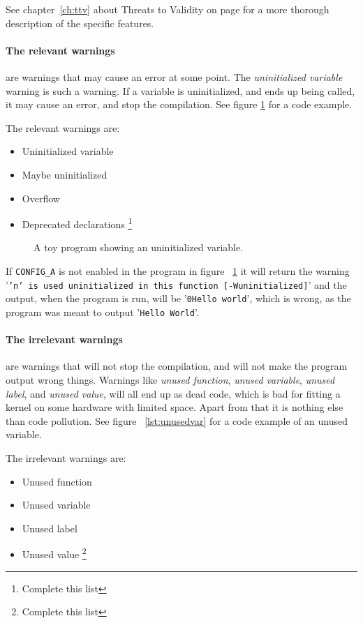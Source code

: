 \documentclass[a4paper,11pt]{report}
\newcommand{\textcode}[1]{
    \fboxsep=1pt
    \texttt{\colorbox{gray!20}{#1}}
}
\newcommand{\figa}{
    \begin{figure}[!htpb]
    \centering
}
\newcommand{\figb}[2]{
    \caption{#1}
    \label{#2}
    \end{figure}
}
\begin{document}
See chapter~\ref{ch:ttv} about Threats to Validity on page \pageref{ch:ttv} 
for a more thorough description of the specific features.


    \paragraph{The relevant warnings}
are warnings that may cause an error at some point. The \emph{uninitialized 
variable} warning is such a warning. If a variable is uninitialized, and ends 
up being called, it may cause an error, and stop the compilation. See figure 
\ref{lst:uninitvar} for a code example.

The relevant warnings are:

\begin{itemize}
    \item Uninitialized variable
    \item Maybe uninitialized
    \item Overflow
    \item Deprecated declarations
        \footnote{Complete this list}
\end{itemize}

\figa
    
\figb{A toy program showing an uninitialized variable.}{lst:uninitvar}

If \textcode{CONFIG\_A} is not enabled in the program in figure 
~\ref{lst:uninitvar} it will return the warning 
'\texttt{'n' is used uninitialized in this function [-Wuninitialized]}' and the 
output, when the program is run, will be '\texttt{0Hello world}',
which is wrong, as the program was meant to output '\texttt{Hello World}'.

    \paragraph{The irrelevant warnings}
are warnings that will not stop the compilation, and will not make the program 
output wrong things. Warnings like \emph{unused function}, \emph{unused 
variable}, \emph{unused label}, and \emph{unused value}, will all end up as 
dead code, which is bad for fitting a kernel on some hardware with limited 
space. Apart from that it is nothing else than code pollution. See figure 
~\ref{lst:unusedvar} for a code example  of an unused variable.

The irrelevant warnings are:

\begin{itemize}
    \item Unused function
    \item Unused variable
    \item Unused label
    \item Unused value
        \footnote{Complete this list}
\end{itemize}
\end{document}
